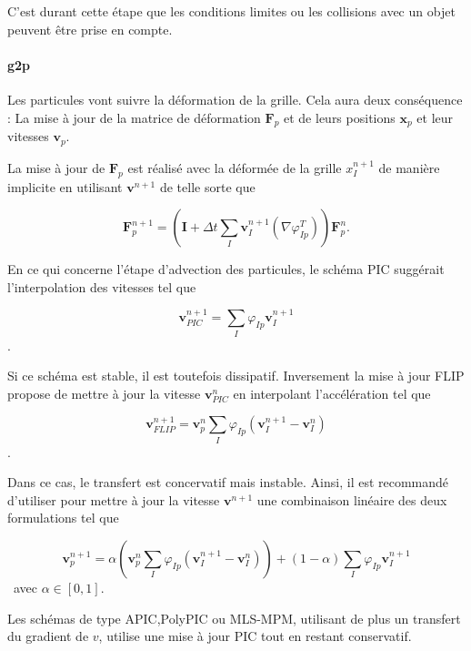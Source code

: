 C'est durant cette étape que les conditions limites ou les collisions avec un objet peuvent être prise en compte.

\paragraph{g2p}

Les particules vont suivre la déformation de la grille. Cela aura deux conséquence : La mise à jour de la matrice de déformation $\bm F_p$ et de leurs positions $\bm x_p$ et leur vitesses $\bm v_p$.

La mise à jour de $\bm F_p$ est réalisé avec la déformée de la grille $ x_I^{n+1}$ de manière implicite en utilisant $\bm v^{n+1}$ de telle sorte que

\begin{equation*}
    \bm F_p^{n+1} = \left( \bm I + \Delta t \sum_I \bm v_I^{n+1} (\nabla \varphi_{Ip}^T)\right) \bm  F_p^{n}.
\end{equation*}

En ce qui concerne l'étape d'advection des particules, le schéma PIC suggérait l'interpolation des vitesses tel que

\begin{equation*}
    \bm v_{PIC}^{n+1} = \sum_I \varphi_{Ip} \bm v_I^{n+1}
\end{equation*}.

Si ce schéma est stable, il est toutefois dissipatif. Inversement la mise à jour FLIP propose de mettre à jour la vitesse $\bm v_{PIC}^{n}$ en interpolant l'accélération tel que

\begin{equation*}
    \bm v_{FLIP}^{n+1} = \bm v_{p}^{n} \sum_I \varphi_{Ip} (\bm v_I^{n+1} - \bm v_I^{n})
\end{equation*}.

Dans ce cas, le transfert est concervatif mais instable. Ainsi, il est recommandé d'utiliser pour mettre à jour la vitesse $\bm v^{n+1}$ une combinaison linéaire des deux formulations tel que

\begin{equation*}
    \bm v_{p}^{n+1} = \alpha \left(\bm v_{p}^{n} \sum_I \varphi_{Ip} (\bm v_I^{n+1} - \bm v_I^{n})\right) + (1- \alpha)\sum_I \varphi_{Ip} \bm v_I^{n+1}
\end{equation*}~avec $\alpha \in [0, 1]$.

Les schémas de type APIC,PolyPIC ou MLS-MPM, utilisant de plus un transfert du gradient de $v$, utilise une mise à jour PIC tout en restant conservatif.

